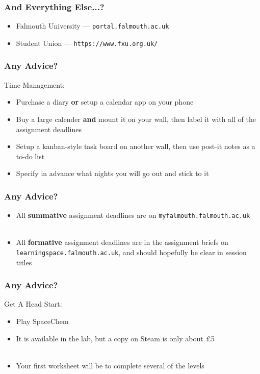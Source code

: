 \begin{frame}
	\frametitle{And Everything Else...?}	
	\begin{itemize}
		\item Falmouth University --- \texttt{portal.falmouth.ac.uk}
		\item Student Union --- \texttt{https://www.fxu.org.uk/}
	\end{itemize}
\end{frame}

\begin{frame}
	\frametitle{Any Advice?}	
	
	Time Management:
	
	\begin{itemize}
		\item Purchase a diary \textbf{or} setup a calendar app on your phone
		\item Buy a large calender \textbf{and} mount it on your wall, then label it with all of the assignment deadlines
		\item Setup a kanban-style task board on another wall, then use post-it notes as a to-do list
		\item Specify in advance what nights you will go out and stick to it
	\end{itemize}
\end{frame}

\begin{frame}
	\frametitle{Any Advice?}	
	
	\begin{itemize}
		\item All \textbf{summative} assignment deadlines are on \texttt{myfalmouth.falmouth.ac.uk}
		\\~\\
		\item All \textbf{formative} assignment deadlines are in the assignment briefs on \texttt{learningspace.falmouth.ac.uk}, and should hopefully be clear in session titles
	\end{itemize}
\end{frame}


\begin{frame}
	\frametitle{Any Advice?}	
	
	Get A Head Start:
	
	\begin{itemize}
		\item Play SpaceChem
		\item It is available in the lab, but a copy on Steam is only about £5
		\\~\\
		\item Your first worksheet will be to complete several of the levels
	\end{itemize}
\end{frame}

